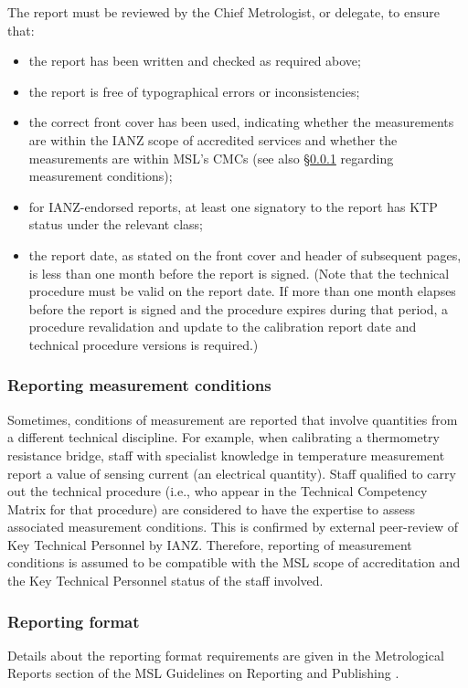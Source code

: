 The report must be reviewed by the Chief Metrologist, or delegate, to ensure that:
\begin{itemize}
\item the report has been written and checked as required above;
\item the report is free of typographical errors or inconsistencies;
\item the correct front cover has been used, indicating whether the measurements are within the IANZ scope of accredited services and whether the measurements are within MSL's CMCs (see also \S\ref{sss:measurement_conditions} regarding measurement conditions);
\item for IANZ-endorsed reports, at least one signatory to the report has KTP status under the relevant class;
\item the report date, as stated on the front cover and header of subsequent pages, is less than one month before the report is signed. (Note that the technical procedure must be valid on the report date. If more than one month elapses before the report is signed and the procedure expires during that period, a procedure revalidation and update to the calibration report date and technical procedure versions is required.)
\end{itemize} 

\subsubsection{Reporting measurement conditions}
\label{sss:measurement_conditions}
Sometimes, conditions of measurement are reported that involve quantities from a different technical discipline. For example, when calibrating a thermometry resistance bridge, staff with specialist knowledge in temperature measurement report a value of sensing current (an electrical quantity). Staff qualified to carry out the technical procedure (i.e., who appear in the Technical Competency Matrix for that procedure) are considered to have the expertise to assess associated measurement conditions. This is confirmed by external peer-review of Key Technical Personnel by IANZ. Therefore, reporting of measurement conditions is assumed to be compatible with the MSL scope of accreditation and the Key Technical Personnel status of the staff involved.

\subsubsection{Reporting format}
Details about the reporting format requirements are given in the Metrological Reports section of the MSL Guidelines on Reporting and Publishing \cite[\S\ref*{GRP-s:metrological_reports}]{MSL_Reporting_Guidelines}.

